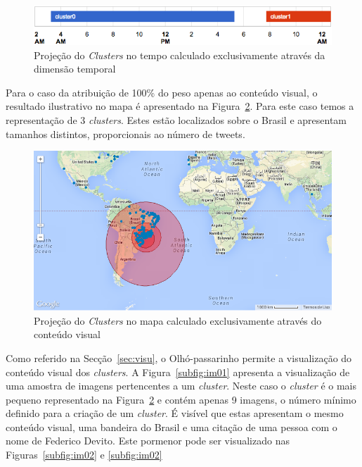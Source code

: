 \begin{figure}[!h]
\centering
\includegraphics[width=0.9\linewidth]{./figures/olhopassarinho/time11}
\caption{Projeção do \textit{Clusters} no tempo calculado exclusivamente através da dimensão temporal}
\label{fig:time11}
\end{figure}

Para o caso da atribuição de 100\% do peso apenas ao conteúdo visual, o resultado ilustrativo no mapa é apresentado na Figura~\ref{fig:map33}. Para este caso temos a representação de 3 \textit{clusters}. Estes estão localizados sobre o Brasil e apresentam tamanhos distintos, proporcionais ao número de tweets.

\begin{figure}[!h]
\centering
\includegraphics[width=0.8\linewidth]{./figures/olhopassarinho/map33}
\caption{Projeção do \textit{Clusters} no mapa calculado exclusivamente através do conteúdo visual}
\label{fig:map33}
\end{figure}

Como referido na Secção~\ref{sec:visu}, o Olhó-passarinho permite a visualização do conteúdo visual dos \textit{clusters}. A Figura~\ref{subfig:im01} apresenta a visualização de uma amostra de imagens pertencentes a um \textit{cluster}. Neste caso o \textit{cluster} é o mais pequeno representado na Figura~\ref{fig:map33} e contém apenas 9 imagens, o número mínimo definido para a criação de um \textit{cluster}. É visível que estas apresentam o mesmo conteúdo visual, uma bandeira do Brasil e uma citação de uma pessoa com o nome de Federico Devito. Este pormenor pode ser visualizado nas Figuras~\ref{subfig:im02} e \ref{subfig:im02}


